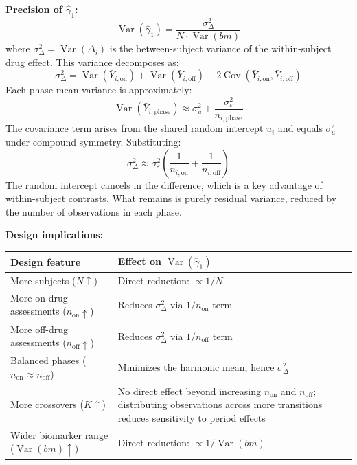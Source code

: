 \documentclass[11pt,letterpaper]{article}
\begin{document}
\textbf{Precision of $\hat{\gamma}_1$:}
\[
\operatorname{Var}(\hat{\gamma}_1) =
\frac{\sigma^2_\Delta}{N \cdot \operatorname{Var}(bm)}
\]
where $\sigma^2_\Delta = \operatorname{Var}(\Delta_i)$ is the
between-subject variance of the within-subject drug effect. This
variance decomposes as:
\[
\sigma^2_\Delta = \operatorname{Var}(\bar{Y}_{i,\text{on}}) +
\operatorname{Var}(\bar{Y}_{i,\text{off}}) -
2\operatorname{Cov}(\bar{Y}_{i,\text{on}},\bar{Y}_{i,\text{off}})
\]
Each phase-mean variance is approximately:
\[
\operatorname{Var}(\bar{Y}_{i,\text{phase}}) \approx
\sigma^2_u + \frac{\sigma^2_\varepsilon}{n_{i,\text{phase}}}
\]
The covariance term arises from the shared random intercept $u_i$ and
equals $\sigma^2_u$ under compound symmetry. Substituting:
\[
\sigma^2_\Delta \approx
\sigma^2_\varepsilon \!\left(
\frac{1}{n_{i,\text{on}}} + \frac{1}{n_{i,\text{off}}}
\right)
\]
The random intercept cancels in the difference, which is a key advantage
of within-subject contrasts. What remains is purely residual variance,
reduced by the number of observations in each phase.

\textbf{Design implications:}

\begin{table}[h]
\centering\small
\begin{tabular}{@{}L{4.5cm}L{9cm}@{}}
\toprule
Design feature & Effect on $\operatorname{Var}(\hat{\gamma}_1)$ \\
\midrule
More subjects ($N \uparrow$) & Direct reduction: $\propto 1/N$ \\
More on-drug assessments ($n_{\text{on}} \uparrow$) & Reduces $\sigma^2_\Delta$ via $1/n_{\text{on}}$ term \\
More off-drug assessments ($n_{\text{off}} \uparrow$) & Reduces $\sigma^2_\Delta$ via $1/n_{\text{off}}$ term \\
Balanced phases ($n_{\text{on}} \approx n_{\text{off}}$) & Minimizes the harmonic mean, hence $\sigma^2_\Delta$ \\
More crossovers ($K \uparrow$) & No direct effect beyond increasing $n_{\text{on}}$ and $n_{\text{off}}$; distributing observations across more transitions reduces sensitivity to period effects \\
Wider biomarker range ($\operatorname{Var}(bm) \uparrow$) & Direct reduction: $\propto 1/\operatorname{Var}(bm)$ \\
\bottomrule
\end{tabular}
\end{table}
\end{document}

